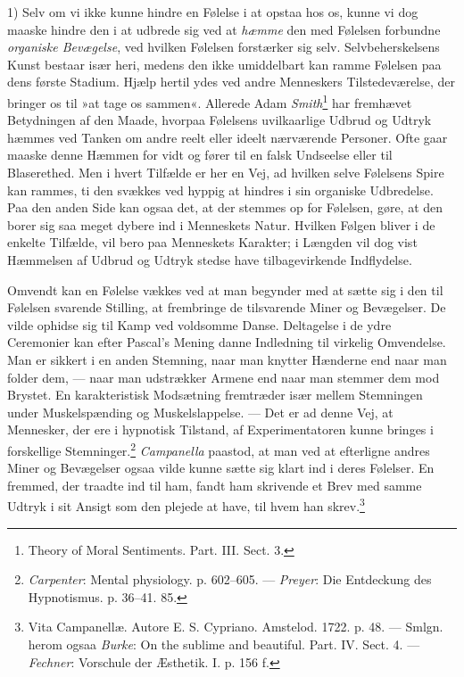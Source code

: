 \documentclass[12pt,a4paper,openany]{book}
\newcommand{\opage}[1]{\marginnote{\footnotesize\textit{[#1]}}}
\begin{document}
1) Selv om vi ikke kunne hindre en Følelse i at opstaa hos os, kunne vi
dog maaske hindre den i at udbrede sig ved at \emph{hæmme} den med
Følelsen forbundne \emph{organiske Bevægelse}, ved hvilken Følelsen
forstærker sig selv. Selvbeherskelsens Kunst bestaar især heri, medens
den ikke umiddelbart kan ramme Følelsen paa dens første Stadium. Hjælp
hertil ydes ved andre Menneskers Tilstedeværelse, der bringer os til »at
tage os sammen«. Allerede Adam \emph{Smith}\footnote[1]{Theory of Moral
Sentiments. Part. III. Sect. 3.} har fremhævet Betydningen af den Maade,
hvorpaa Følelsens uvilkaarlige Udbrud og Udtryk hæmmes ved Tanken om
andre reelt eller ideelt nærværende Personer. Ofte gaar maaske denne
Hæmmen for vidt og fører til en falsk Undseelse eller til Blaserethed.
Men i hvert Tilfælde er her en Vej, ad hvilken selve Følelsens Spire kan
rammes, ti den svækkes ved hyppig at hindres i sin organiske Udbredelse.
Paa den anden Side
\opage{388}kan ogsaa det, at der stemmes op for Følelsen, gøre, at den
borer sig saa meget dybere ind i Menneskets Natur. Hvilken Følgen bliver
i de enkelte Tilfælde, vil bero paa Menneskets Karakter; i Længden vil
dog vist Hæmmelsen af Udbrud og Udtryk stedse have tilbagevirkende
Indflydelse.

Omvendt kan en Følelse vækkes ved at man begynder med at sætte sig i den
til Følelsen svarende Stilling, at frembringe de tilsvarende Miner og
Bevægelser. De vilde ophidse sig til Kamp ved voldsomme Danse.
Deltagelse i de ydre Ceremonier kan efter Pascal’s Mening danne
Indledning til virkelig Omvendelse. Man er sikkert i en anden Stemning,
naar man knytter Hænderne end naar man folder dem, --- naar man
udstrækker Armene end naar man stemmer dem mod Brystet. En
karakteristisk Modsætning fremtræder især mellem Stemningen under
Muskelspænding og Muskelslappelse. --- Det er ad denne Vej, at
Mennesker, der ere i hypnotisk Tilstand, af Experimentatoren kunne
bringes i forskellige Stemninger.\footnote[1]{\emph{Carpenter}: Mental physiology. p. 602--605. --- \emph{Preyer}: Die Entdeckung des Hypnotismus. p.
36--41. 85.} \emph{Campanella} paastod, at man ved at efterligne andres
Miner og Bevægelser ogsaa vilde kunne sætte sig klart ind i deres
Følelser. En fremmed, der traadte ind til ham, fandt ham skrivende et
Brev med samme Udtryk i sit Ansigt som den plejede at have, til hvem han
skrev.\footnote[2]{Vita Campanellæ. Autore E. S. Cypriano. Amstelod.
1722. p. 48. --- Smlgn. herom ogsaa \emph{Burke}: On the sublime and
beautiful. Part. IV. Sect. 4. --- \emph{Fechner}: Vorschule der
Æsthetik. I. p. 156 f.}
\end{document}

